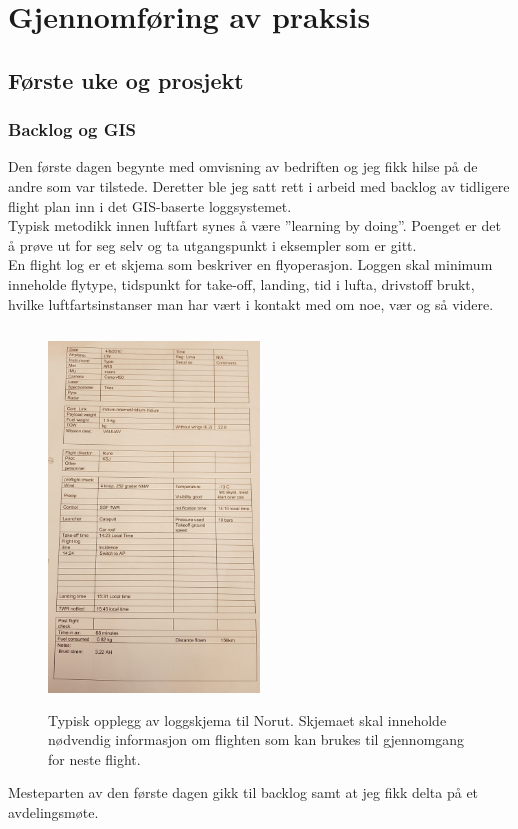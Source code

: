 \documentclass[12pt, a4paper]{article}
\begin{document}
\newpage
\section{Gjennomføring av praksis}
\subsection{Første uke og prosjekt}
\subsubsection{Backlog og GIS}
Den første dagen begynte med omvisning av bedriften og jeg fikk hilse på de andre som var tilstede. Deretter ble jeg satt rett i arbeid med backlog av tidligere flight plan inn i det GIS-baserte loggsystemet. \\
Typisk metodikk innen luftfart synes å være ''learning by doing''. Poenget er det å prøve ut for seg selv og ta utgangspunkt i eksempler som er gitt.\\
En flight log er et skjema som beskriver en flyoperasjon. Loggen skal minimum inneholde flytype, tidspunkt for take-off, landing, tid i lufta, drivstoff brukt, hvilke luftfartsinstanser man har vært i kontakt med om noe, vær og så videre. 

\begin{figure}[ht]
	\centering
	\includegraphics[height= 10cm, width=0.5\textwidth]{bilder/flightlogNorut.png}
		\caption[Loggskjema]{Typisk opplegg av loggskjema til Norut. Skjemaet skal inneholde nødvendig informasjon om flighten som kan brukes til gjennomgang for neste flight. }
\end{figure}
\newpage
Mesteparten av den første dagen gikk til backlog samt at jeg fikk delta på et avdelingsmøte.\\
\end{document}
